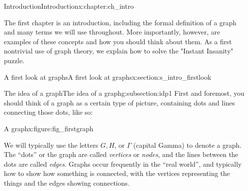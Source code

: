 \documentclass[oneside,10pt,]{book}
\numberwithin{equation}{section}
\begin{document}
\frontmatter
\setcounter{tocdepth}{1}
\renewcommand*\contentsname{Contents}
\tableofcontents
\mainmatter
%
%
\typeout{************************************************}
\typeout{************************************************}
%
\begin{chapterptx}{Introduction}{}{Introduction}{}{}{x:chapter:ch_intro}
\begin{introduction}{}%
The first chapter is an introduction, including the formal definition of a graph and many terms we will use throughout.  More importantly, however, are examples of these concepts and how you should think about them.  As a first nontrivial use of graph theory, we explain how to solve the "Instant Insanity" puzzle.%
\end{introduction}%
%
%
\typeout{************************************************}
\typeout{************************************************}
%
\begin{sectionptx}{A first look at graphs}{}{A first look at graphs}{}{}{x:section:s_intro_firstlook}
%
%
\typeout{************************************************}
\typeout{************************************************}
%
\begin{subsectionptx}{The idea of a graph}{}{The idea of a graph}{}{}{g:subsection:idp1}
First and foremost, you should think of a graph as a certain type of picture, containing dots and lines connecting those dots, like so:%
\begin{figureptx}{A graph}{x:figure:fig_firstgraph}{}%
\begin{image}{0.1}{0.8}{0.1}%
%
\end{image}%
\tcblower
\end{figureptx}%
We will typically use the letters \(G, H\), or \(\Gamma\) (capital Gamma) to denote a graph.  The ``dots'' or the graph are called \emph{vertices} or \emph{nodes}, and the lines between the dots are called \emph{edges}. Graphs occur frequently in the ``real world'', and typically how to show how something is connected, with the vertices representing the things and the edges showing connections.%

\end{subsectionptx}
\end{sectionptx}
\end{chapterptx}
\end{document}
